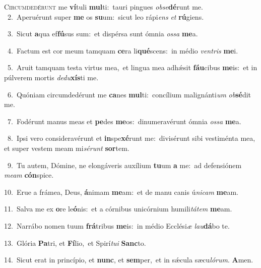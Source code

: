 \lettrine{\initial\textcolor{\initialcolor}{C}}{ircumdedérunt} me \textbf{ví}\-tuli \textbf{mul}\-ti:~\star tauri pingues \textit{ob}\-\textit{se}\textbf{dé}runt me.\\
{\numbfont\textcolor{\numbcolor}{~2.}}~Aperuérunt super \textbf{me} os \textbf{su}\-um:~\star sicut leo rápi\textit{ens} \textit{et} \textbf{rú}\-giens.\par
{\numbfont\textcolor{\numbcolor}{~3.}}~Sicut \textbf{a}\-qua ef\-\textbf{fú}\-sus sum:~\star et dispérsa sunt ómnia \textit{os}\-\textit{sa} \textbf{me}\-a.\par
{\numbfont\textcolor{\numbcolor}{~4.}}~Factum est cor meum tamquam \textbf{ce}\-ra li\-\textbf{qué}\-scens:~\star in médio \textit{ven}\-\textit{tris} \textbf{me}\-i.\par
{\numbfont\textcolor{\numbcolor}{~5.}}~Aruit tamquam testa virtus mea,~\dagger et lingua mea adhǽsit \textbf{fáu}\-cibus \textbf{me}\-is:~\star et in púlverem mortis \textit{de}\-\textit{du}\textbf{xís}ti me.\par
{\numbfont\textcolor{\numbcolor}{~6.}}~Quóniam circumdedérunt me \textbf{ca}\-nes \textbf{mul}\-ti:~\star concílium malignánti\textit{um} \textit{ob}\-\textbf{sé}dit me.\par
{\numbfont\textcolor{\numbcolor}{~7.}}~Fodérunt manus meas et \textbf{pe}\-des \textbf{me}\-os:~\star dinumeravérunt ómnia \textit{os}\-\textit{sa} \textbf{me}\-a.\par
{\numbfont\textcolor{\numbcolor}{~8.}}~Ipsi vero consideravérunt et \textbf{in}\-spe\-\textbf{xé}\-runt me:~\star divisérunt sibi vestiménta mea, et super vestem meam mi\-\textit{sé}\-\textit{runt} \textbf{sor}\-tem.\par
{\numbfont\textcolor{\numbcolor}{~9.}}~Tu autem, Dómine, ne elongáveris auxílium \textbf{tu}\-um \textbf{a} me:~\star ad defensiónem \textit{me}\-\textit{am} \textbf{cón}\-spice.\par
{\numbfont\textcolor{\numbcolor}{10.}}~Erue a frámea, Deus, \textbf{á}\-nimam \textbf{me}\-am:~\star et de manu canis ú\-\textit{ni}\-\textit{cam} \textbf{me}\-am.\par
{\numbfont\textcolor{\numbcolor}{11.}}~Salva me ex \textbf{o}\-re le\-\textbf{ó}\-nis:~\star et a córnibus unicórnium humili\-\textit{tá}\-\textit{tem} \textbf{me}\-am.\par
{\numbfont\textcolor{\numbcolor}{12.}}~Narrábo nomen tuum \textbf{frá}\-tribus \textbf{me}\-is:~\star in médio Ecclési\textit{æ} \textit{lau}\-\textbf{dá}bo te.\par
{\numbfont\textcolor{\numbcolor}{13.}}~Glória \textbf{Pa}\-tri, et \textbf{Fí}\-lio,~\star et Spirí\-\textit{tu}\-\textit{i} \textbf{Sanc}\-to.\par
{\numbfont\textcolor{\numbcolor}{14.}}~Sicut erat in princípio, et \textbf{nunc}\-, et \textbf{sem}\-per,~\star et in sǽcula sæcu\-\textit{ló}\-\textit{rum}. \textbf{A}\-men.\par
